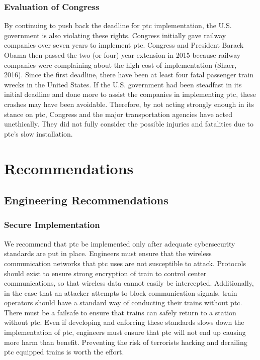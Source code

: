 \documentclass[11pt, titlepage]{article}
\begin{document}
\subsubsection{Evaluation of Congress}

By continuing to push back the deadline for \gls{ptc} implementation, the U.S.
government is also violating these rights. Congress initially gave railway companies
over seven years to implement \gls{ptc}. Congress and President Barack Obama then
passed the two (or four) year extension in 2015 because railway companies were
complaining about the high cost of implementation (Shaer, 2016). Since the first
deadline, there have been at least four fatal passenger train wrecks in the United
States. If the U.S. government had been steadfast in its initial deadline and done
more to assist the companies in implementing \gls{ptc}, these crashes may have been
avoidable. Therefore, by not acting strongly enough in its stance on \gls{ptc},
Congress and the major transportation agencies have acted unethically. They did not
fully consider the possible injuries and fatalities due to \gls{ptc}’s slow
installation.

\pagebreak

\section{Recommendations}

\subsection{Engineering Recommendations}

\subsubsection{Secure Implementation}

We recommend that \gls{ptc} be implemented only after adequate cybersecurity
standards are put in place. Engineers must ensure that the wireless communication
networks that \gls{ptc} uses are not susceptible to attack. Protocols should exist
to ensure strong encryption of train to control center communications, so that
wireless data cannot easily be intercepted. Additionally, in the case that an
attacker attempts to block communication signals, train operators should have a
standard way of conducting their trains without \gls{ptc}. There must be a failsafe
to ensure that trains can safely return to a station without \gls{ptc}. Even if
developing and enforcing these standards slows down the implementation of \gls{ptc},
engineers must ensure that \gls{ptc} will not end up causing more harm than benefit.
Preventing the risk of  terrorists hacking and derailing \gls{ptc} equipped trains
is worth the effort.
\end{document}
